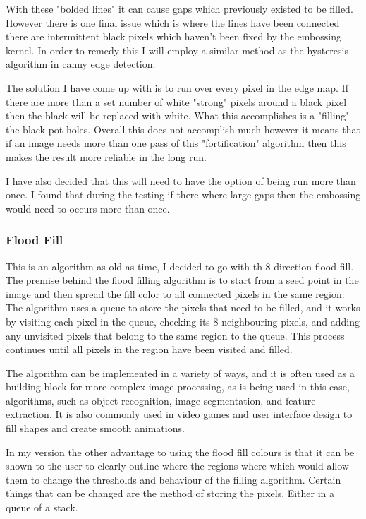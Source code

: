 \begin{FlushLeft}
    With these "bolded lines" it can cause gaps which previously existed to be filled. However there is one final issue which is where the lines have been connected there are intermittent black pixels which haven't been fixed by the embossing kernel. In order to remedy this I will employ a similar method as the hysteresis algorithm in canny edge detection. \\ \bk
    
    The solution I have come up with is to run over every pixel in the edge map. If there are more than a set number of white "strong" pixels around a black pixel then the black will be replaced with white. What this accomplishes is a "filling" the black pot holes. Overall this does not accomplish much however it means that if an image needs more than one pass of this "fortification" algorithm then this makes the result more reliable in the long run. \\ \bk

    I have also decided that this will need to have the option of being run more than once. I found that during the testing if there where large gaps then the embossing would need to occurs more than once.\\
    \bk

    \subsubsection{Flood Fill}
    This is an algorithm as old as time, I decided to go with th 8 direction flood fill. The premise behind the flood filling algorithm is to start from a seed point in the image and then spread the fill color to all connected pixels in the same region. The algorithm uses a queue to store the pixels that need to be filled, and it works by visiting each pixel in the queue, checking its 8 neighbouring pixels, and adding any unvisited pixels that belong to the same region to the queue. This process continues until all pixels in the region have been visited and filled. \\ \bk

    The algorithm can be implemented in a variety of ways, and it is often used as a building block for more complex image processing, as is being used in this case, algorithms, such as object recognition, image segmentation, and feature extraction. It is also commonly used in video games and user interface design to fill shapes and create smooth animations. \\ \bk

    In my version the other advantage to using the flood fill colours is that it can be shown to the user to clearly outline where the regions where which would allow them to change the thresholds and behaviour of the filling algorithm. Certain things that can be changed are the method of storing the pixels. Either in a queue of a stack. \\ 
    \bk


\end{FlushLeft}
